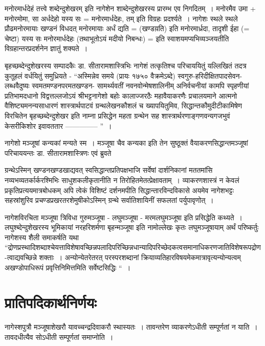 {मनोरमार्धदेहं तत्त्वे शब्देन्दुशेखरम् इति नागेशेन शाब्देन्दुशेखरस्य प्रारम्भ एव निगदितम्~। मनोरमैव उमा + मनोरमोमा, सा अर्धदेहो यस्य सः = मनोरमार्धदेहः, तम् इति विग्रहः प्रदर्श्यते~। नागेशः स्थले स्थले प्रौढमनोरमायाः खण्डनं विधदत् मनोरमायाः अर्धं द्यति = (खण्डय़ति) इति मनोरमार्ध्रदा, तादृशी ईहा (= चेष्टा) यस्य सः मनोरमार्धदेहः (तथाभूतोऽयं मदीयो निबन्धः) = इति स्वाशयमप्यभिव्यञ्जयतीति विग्रहान्तरप्रदर्शनेन ज्ञातुं शक्यते~। 

बृहच्छब्देन्दुशेखरस्य सम्पादकैः डा. सीतारामशास्त्रिभिः नागेशं तत्कृतिश्च परिचाययितुं यल्लिखितं तदत्र कुतूहलं वर्धयितुं समुध्रियते - “अस्मिन्नेव समये (प्रायः १७५० वैक्रमेऽब्दे) स्वगुरु-हरिदीक्षितपादसेवन-लब्धवैदुष्यः स्वमतमण्डनपरमतखण्डन- सामर्थ्यवतीं नवनवोन्मेषशालिनीम् अनिर्वचनीयां कामपि स्पृहणीयां प्रतिभामदधानो विद्वत्तल्लजोऽयं श्रीभट्टनागेशो बहोः कालाज्जरठैः महावैयाकरणैः प्रचालयमाने आत्मनो वैशिष्ट्यमनन्यसाधारणं शास्त्रार्थपाटवं ग्रन्थलेखनकौशलं च ख्यापयितुमिव, सिद्धान्तकौमुदीटीकामिषेण विरचितेन बृहच्छब्देन्दुशेखर इति नाम्ना प्रसिद्धेन महता ग्रन्थेन सह शास्त्रार्थरणाङ्गणवन्यगजभुवं केसरीकिशोर इवावततार -------------- ”~। 

नागेशो मञ्जूषां कन्यकां मन्यते स्म~। मञ्जूषा चैव कन्यका इति तेन सुष्ठूक्तं वैयाकरणसिद्धान्तमञ्जूषां परिचाययन्तः डा. सीतारामशास्त्रिणः एवं ब्रुवते 

ग्रन्थेऽस्मिन् खण्डनखण्डखाद्यवत् स्वसिद्धान्तप्रतिपक्षभाजि सर्वेषां दार्शनिकानां मततमांसि नव्यभव्यतर्कार्करश्मिभिः साधुशकलीकृतानीति न तिरोहितमेतत्प्रेक्षावताम्~। व्याकरणशास्त्रं न केवलं प्रकृतिप्रत्ययमात्रबोधकम् अपि त्वेकं विशिष्टं दर्शनमपीति सिद्धान्तारविन्दविकासे अयमेव नागेशभट्टः सहस्रांशुरिव प्रचण्डप्रखरतरशेमुषीकोऽस्मिन् ग्रन्थे सर्वातिशायिनीं सफलतां पर्युपावृणोत्~। 

नागेशविरचिता मञ्जूषा त्रिविधा  गुरुमञ्जूषा - लघुमञ्जूषा - मरमलघुमञ्जूषा इति प्रसिद्धेति कथ्यते~। लघुश्ब्देन्दुशेखरस्य भूमिकायां नरहरिशर्मणा बृहन्मञ्जूषा इति नामोल्लेखः कृतः लघुमञ्जूषायाम् अर्थं परिष्कर्तुः नागेशस्य शैली समाकर्षति यथा  “द्रोणप्रस्थादिशब्दाश्चेयत्ता\-विशेषावच्छिन्नपलादिपरिच्छिन्नधान्यादिपरिच्छेदकत्वसमानाधिकरणजातिविशेषरूपद्रोण-\break त्वाद्यवच्छिन्ने शक्ताः~। अन्योन्येतरेतरत् परस्परशब्दानां क्रियाव्यतिहारविषयमेकमात्रावृत्यन्योन्यत्वम् अखण्डोपाधिरूपं प्रवृत्तिनिमित्तमिति सर्वेष्टसिद्धिः “~। 

\section*{प्रातिपदिकार्थनिर्णयः}

नागेस्शपुत्रौ मञ्जूषाशेखरौ यावच्चन्द्रदिवाकरौ स्थास्यतः~। तावन्तरेण व्याकरणेऽधीती सम्पूर्णतां न याति~। तावदधीत्यैव सोऽधीती सम्पूर्णतां समाप्नोति~। 

\articleend
}

